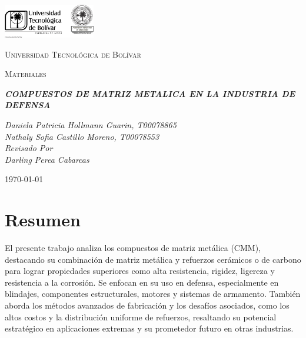 \documentclass[letterpaper, 12pt]{article}
\begin{document}
\begin{titlepage}
      \centering
      \includegraphics[width=0.3\textwidth]{Images/logo_utb.png}\par\vspace{1cm}
      {\scshape\LARGE Universidad Tecnológica de Bolívar \par}
      \vspace{1cm}

      {\scshape\Large Materiales \par}
      \vspace{1cm}

      \slshape {\Large \bfseries{}COMPUESTOS DE MATRIZ METALICA EN LA INDUSTRIA DE DEFENSA\\}
      \vspace{4cm}

      \slshape {\itshape{}Daniela Patricia Hollmann Guarin, T00078865 \\}
      \slshape {\itshape{} Nathaly Sofia Castillo Moreno, T00078553 \\}
      \vfill
      Revisado Por \\
      Darling Perea Cabarcas\\
      {\large \today\par}
\end{titlepage}

\nocite{*}


\section{Resumen}

El presente trabajo analiza los compuestos de matriz metálica (CMM), destacando
su combinación de matriz metálica y refuerzos cerámicos o de carbono para
lograr propiedades superiores como alta resistencia, rigidez, ligereza y
resistencia a la corrosión. Se enfocan en su uso en defensa, especialmente en
blindajes, componentes estructurales, motores y sistemas de armamento. También
aborda los métodos avanzados de fabricación y los desafíos asociados, como los
altos costos y la distribución uniforme de refuerzos, resaltando su potencial
estratégico en aplicaciones extremas y su prometedor futuro en otras
industrias.
\end{document}
